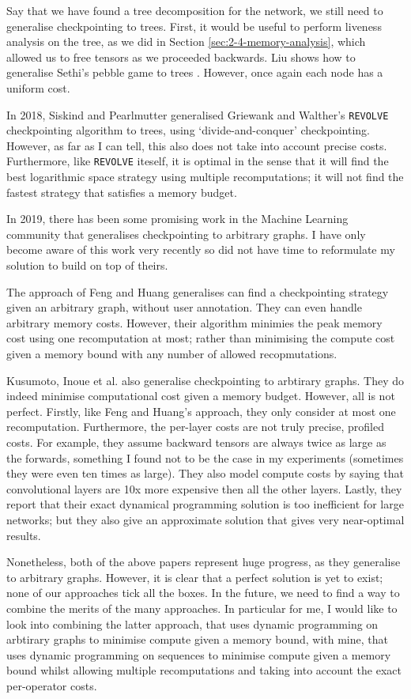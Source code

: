 Say that we have found a tree decomposition for the network, we still need to generalise checkpointing to trees.
First, it would be useful to perform liveness analysis on the tree, as we did in Section \ref{sec:2-4-memory-analysis}, which allowed us to free tensors as we proceeded backwards.
Liu shows how to generalise Sethi's pebble game to trees \cite{Liu1987}.
However, once again each node has a uniform cost.

In 2018, Siskind and Pearlmutter \cite{Siskind2018} generalised Griewank and Walther's \texttt{REVOLVE} checkpointing algorithm to trees, using `divide-and-conquer' checkpointing.
However, as far as I can tell, this also does not take into account precise costs.
Furthermore, like \texttt{REVOLVE} iteself, it is optimal in the sense that it will find the best logarithmic space strategy using multiple recomputations; it will not find the fastest strategy that satisfies a memory budget. 

In 2019, there has been some promising work in the Machine Learning community that generalises checkpointing to arbitrary graphs.
I have only become aware of this work very recently so did not have time to reformulate my solution to build on top of theirs.

The approach of Feng and Huang \cite{Feng2019} generalises can find a checkpointing strategy given an arbitrary graph, without user annotation.
They can even handle arbitrary memory costs.
However, their algorithm minimies the peak memory cost using one recomputation at most; rather than minimising the compute cost given a memory bound with any number of allowed recopmutations.

Kusumoto, Inoue et al. \cite{Kusumoto2019} also generalise checkpointing to arbtirary graphs.
They do indeed minimise computational cost given a memory budget.
However, all is not perfect.
Firstly, like Feng and Huang's approach, they only consider at most one recomputation.
Furthermore, the per-layer costs are not truly precise, profiled costs.
For example, they assume backward tensors are always twice as large as the forwards, something I found not to be the case in my experiments (sometimes they were even ten times as large).
They also model compute costs by saying that convolutional layers are 10x more expensive then all the other layers.
Lastly, they report that their exact dynamical programming solution is too inefficient for large networks; but they also give an approximate solution that gives very near-optimal results.

Nonetheless, both of the above papers represent huge progress, as they generalise to arbitrary graphs.
However, it is clear that a perfect solution is yet to exist;
none of our approaches tick all the boxes.
In the future, we need to find a way to combine the merits of the many approaches.
In particular for me, I would like to look into combining the latter approach, that uses dynamic programming on arbtirary graphs to minimise compute given a memory bound, with mine, that uses dynamic programming on sequences to minimise compute given a memory bound whilst allowing multiple recomputations and taking into account the exact per-operator costs.
